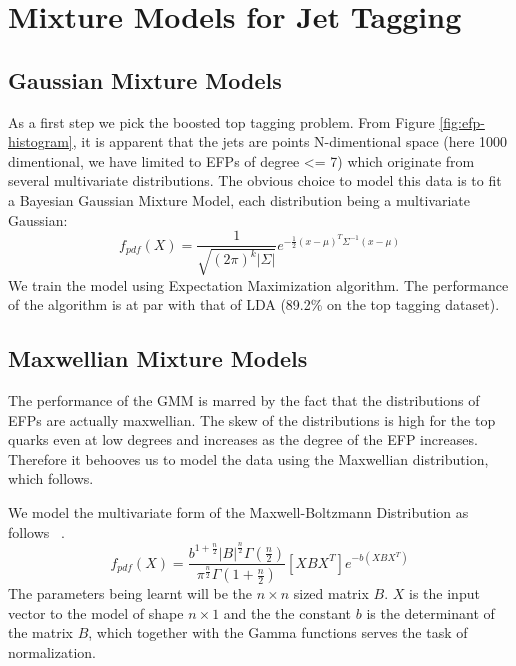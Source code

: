 \section{Mixture Models for Jet Tagging}
\label{sec:tagging}

\subsection{Gaussian Mixture Models}

As a first step we pick the boosted top tagging problem. From Figure \ref{fig:efp-histogram}, it is apparent that the jets are points N-dimentional space (here 1000 dimentional, we have limited to EFPs of degree <= 7) which originate from several multivariate distributions. The obvious choice to model this data is to fit a Bayesian Gaussian Mixture Model, each distribution being a multivariate Gaussian:
\begin{equation}
    f_{pdf}(X) = \frac{1}{\sqrt{(2\pi)^k \vert \Sigma \vert}} e^{-\frac{1}{2} (x - \mu)^T \Sigma^{-1} (x - \mu)}
\end{equation}
We train the model using Expectation Maximization algorithm.
The performance of the algorithm is at par with that of LDA (89.2\% on the top tagging dataset).


\subsection{Maxwellian Mixture Models}

The performance of the GMM is marred by the fact that the distributions of EFPs are actually maxwellian. The skew of the distributions is high for the top quarks even at low degrees and increases as the degree of the EFP increases. Therefore it behooves us to model the data using the Maxwellian distribution, which follows.


We model the multivariate form of the Maxwell-Boltzmann Distribution as follows ~\cite{maxwellian_multivariate}.
\begin{equation}
    f_{pdf}(X) = \frac{b^{1 + \frac{n}{2}} \vert B \vert^\frac{n}{2} \Gamma(\frac{n}{2})}{\pi^{\frac{n}{2}} \Gamma(1 + \frac{n}{2})} [XBX^T] e^{-b(XBX^T)}
\end{equation}
The parameters being learnt will be the $n \times n$ sized matrix $B$. $X$ is the input vector to the model of shape $n \times 1$ and the the constant $b$ is the determinant of the matrix $B$, which together with the Gamma functions serves the task of normalization.

